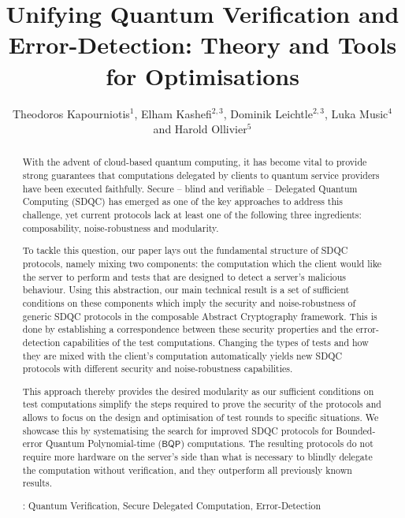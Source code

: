 \documentclass[12pt]{iopart}
\renewcommand{\1}{\mathds{1}}
\begin{document}
\pagestyle{plain}

\title{Unifying Quantum Verification and Error-Detection: Theory and Tools for Optimisations}

\author{Theodoros Kapourniotis$^1$, Elham Kashefi$^{2,3}$, 
Dominik Leichtle$^{2, 3}$, Luka Music$^4$ and Harold Ollivier$^5$}

\address{$^1$Department of Physics, University of Warwick, Coventry CV4 7AL, United Kingdom}
\address{$^2$Laboratoire d’Informatique de Sorbonne Université, CNRS, Sorbonne Université, 75005 Paris, France}
\address{$^3$School of Informatics, University of Edinburgh, Edinburgh EH8 9AB, United Kingdom}
\address{$^4$Quandela, 91300 Massy, France}
\address{$^5$DI-ENS, Ecole Normale Supérieure, PSL University, CNRS, INRIA, 75005 Paris, France}

\begin{abstract}
With the advent of cloud-based quantum computing, it has become vital to provide strong guarantees that computations delegated by clients to quantum service providers have been executed faithfully. Secure -- blind and verifiable -- Delegated Quantum Computing (SDQC) has emerged as one of the key approaches to address this challenge, yet current protocols lack at least one of the following three ingredients: composability, noise-robustness and modularity.

To tackle this question, our paper lays out the fundamental structure of SDQC protocols, namely mixing two components: the computation which the client would like the server to perform and tests that are designed to detect a server's malicious behaviour. Using this abstraction, our main technical result is a set of sufficient conditions on these components which imply the security and noise-robustness of generic SDQC protocols in the composable Abstract Cryptography framework. This is done by establishing a correspondence between these security properties and the error-detection capabilities of the test computations. Changing the types of tests and how they are mixed with the client's computation automatically yields new SDQC protocols with different security and noise-robustness capabilities.

This approach thereby provides the desired modularity as our sufficient conditions on test computations simplify the steps required to prove the security of the protocols and allows to focus on the design and optimisation of test rounds to specific situations. We showcase this by systematising the search for improved SDQC protocols for Bounded-error Quantum Polynomial-time ($\mathsf{BQP}$) computations. The resulting protocols do not require more hardware on the server's side than what is necessary to blindly delegate the computation without verification, and they outperform all previously known results.

: Quantum Verification, Secure Delegated Computation, Error-Detection
\end{abstract}
\end{document}
